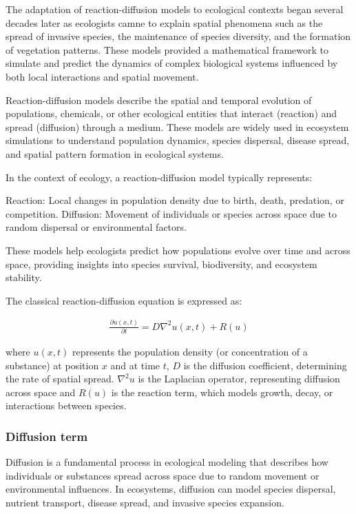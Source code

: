The adaptation of reaction-diffusion models to ecological contexts began several decades later as ecologists camne to explain spatial phenomena such as the spread of invasive species, the maintenance of species diversity, and the formation of vegetation patterns. These models provided a mathematical framework to simulate and predict the dynamics of complex biological systems influenced by both local interactions and spatial movement.

Reaction-diffusion models describe the spatial and temporal evolution of populations, chemicals, or other ecological entities that interact (reaction) and spread (diffusion) through a medium. These models are widely used in ecosystem simulations to understand population dynamics, species dispersal, disease spread, and spatial pattern formation in ecological systems.

In the context of ecology, a reaction-diffusion model typically represents:
\begin{Itemize}
    \Item{} Reaction: Local changes in population density due to birth, death, predation, or competition.
    \Item{} Diffusion: Movement of individuals or species across space due to random dispersal or environmental factors.
\end{Itemize}
These models help ecologists predict how populations evolve over time and across space, providing insights into species survival, biodiversity, and ecosystem stability.

The classical reaction-diffusion equation is expressed as:

\begin{align}
    \label{eq:env-obj_classic-reaction-diffusion}
    \frac{\partial u (x, t)}{\partial t} = D \nabla^2 u(x, t) + R(u)
\end{align}

where $u(x,t)$ represents the population density (or concentration of a substance) at position $x$ and at time $t$, $D$ is the diffusion coefficient, determining the rate of spatial spread. $\nabla^2 u$ is the Laplacian operator, representing diffusion across space and $R(u)$ is the reaction term, which models growth, decay, or interactions between species.

\subsubsection{Diffusion term}
Diffusion is a fundamental process in ecological modeling that describes how individuals or substances spread across space due to random movement or environmental influences. In ecosystems, diffusion can model species dispersal, nutrient transport, disease spread, and invasive species expansion.


